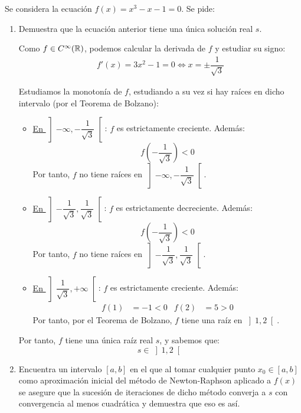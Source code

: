 \begin{ejercicio}
    Se considera la ecuación $f(x) = x^3 - x - 1 = 0$. Se pide:
    \begin{enumerate}
        \item Demuestra que la ecuación anterior tiene una única solución real $s$.
        
        Como $f\in C^\infty(\mathbb{R})$, podemos calcular la derivada de $f$ y estudiar su signo:
        \begin{align*}
            f'(x) = 3x^2 - 1 = 0
            \iff x = \pm \dfrac{1}{\sqrt{3}}
        \end{align*}

        Estudiamos la monotonía de $f$, estudiando a su vez si hay raíces en dicho intervalo (por el Teorema de Bolzano):
        \begin{itemize}
            \item \ul{En $\left]-\infty, -\dfrac{1}{\sqrt{3}}\right[$}: $f$ es estrictamente creciente. Además:
            \begin{equation*}
                f\left(-\dfrac{1}{\sqrt{3}}\right)<0
            \end{equation*}
            Por tanto, $f$ no tiene raíces en $\left]-\infty, -\dfrac{1}{\sqrt{3}}\right[$.
            
            \item \ul{En $\left]-\dfrac{1}{\sqrt{3}}, \dfrac{1}{\sqrt{3}}\right[$}: $f$ es estrictamente decreciente. Además:
            \begin{equation*}
                f\left(-\dfrac{1}{\sqrt{3}}\right)<0
            \end{equation*}
            Por tanto, $f$ no tiene raíces en $\left]-\dfrac{1}{\sqrt{3}}, \dfrac{1}{\sqrt{3}}\right[$.
            
            \item \ul{En $\left]\dfrac{1}{\sqrt{3}}, +\infty\right[$}: $f$ es estrictamente creciente. Además:
            \begin{align*}
                f\left(1\right)&=-1<0&
                f(2)&=5>0
            \end{align*}
            Por tanto, por el Teorema de Bolzano, $f$ tiene una raíz en $\left]1, 2\right[$.
        \end{itemize}

        Por tanto, $f$ tiene una única raíz real $s$, y sabemos que:
        \begin{equation*}
            s\in \left]1, 2\right[
        \end{equation*}
        \item Encuentra un intervalo $[a, b]$ en el que al tomar cualquier punto $x_0 \in [a, b]$ como aproximación inicial del método de Newton-Raphson aplicado a $f(x)$ se asegure que la sucesión de iteraciones de dicho método converja a $s$ con convergencia al menos cuadrática y demuestra que eso es así.\\
        

\end{enumerate}
\end{ejercicio}
